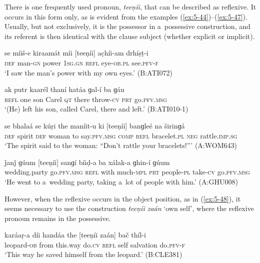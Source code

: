 There is one frequently used pronoun, \textit{teeṇíi,} that can be described as reflexive. It
occurs in this form only, as is evident from the examples (\ref{ex:5-44})--(\ref{ex:5-47}). Usually, but not
exclusively, it is the possessor in a~possessive construction, and its referent is then identical
with the clause subject (whether explicit or implicit).

\begin{exe}
\ex
\label{ex:5-44}
\gll se míiš-e kiraamát míi [teeṇíi] ac̣híi-am drhíṣṭ-i\\
\textsc{def} man-\textsc{gn} power \textsc{1sg.gn} \textsc{refl} eye-\textsc{ob.pl} see.\textsc{pfv-f}\\
\glt `I saw the man's power with my own eyes.' (B:ATI072)

\ex
\label{ex:5-45}
\gll [teeṇíi] ak putr kaarél thaní hatáa ɡal-í ba ɡáu \\
\textsc{refl} one son Carel \textsc{qt} there throw-\textsc{cv} \textsc{prt} go.\textsc{pfv.msg}\\
\glt `(He) left his son, called Carel, there and left.' (B:ATI010-1)

\ex
\label{ex:5-46}
\gll se bhalaá se kúṛi the maníit-u ki [teeṇíi] banɡleé na širinɡá\\
\textsc{def} spirit \textsc{def} woman to say.\textsc{pfv.msg} \textsc{comp} \textsc{refl} bracelet.\textsc{pl} \textsc{neg} rattle.\textsc{imp.sg}\\
\glt `The spirit said to the woman: ``Don't rattle your bracelets!''' (A:WOM643)

\ex
\label{ex:5-47}
\gll ǰanǰ ɡúum [teeṇíi] sanɡí bíiḍ-a ba xálak-a ɡhin-í ɡúum\\
wedding.party go.\textsc{pfv.msg } \textsc{refl} with much-\textsc{mpl} \textsc{prt} people-\textsc{pl} take-\textsc{cv} go.\textsc{pfv.msg}\\
\glt `He went to a~wedding party, taking a~lot of people with him.' (A:GHU008)
\end{exe}
However, when the reflexive occurs in the object position, as in (\ref{ex:5-48}), it seems necessary to use the construction \textit{teeṇíi zaán} `own self', where the reflexive pronoun remains in the possessive.
\begin{exe}
\ex
\label{ex:5-48}
\gll karáaṛ-a díi handáa the [teeṇíi zaán] bač thíl-i\\
leopard-\textsc{ob} from this.way do.\textsc{cv} \textsc{refl} self salvation do.\textsc{pfv-f}\\
\glt `This way he saved himself from the leopard.' (B:CLE381)
\end{exe}

